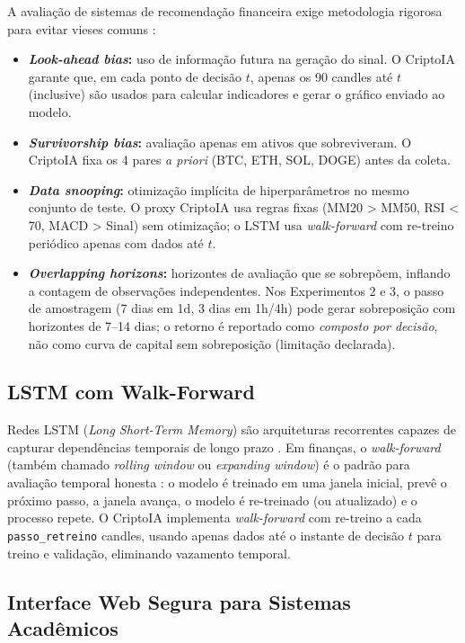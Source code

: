 \documentclass[conference]{IEEEtran}
\begin{document}
A avaliação de sistemas de recomendação financeira exige metodologia rigorosa para evitar vieses comuns \cite{bailey2014pseudomathematics}:

\begin{itemize}
  \item \textbf{\textit{Look-ahead bias}:} uso de informação futura na geração do sinal. O CriptoIA garante que, em cada ponto de decisão $t$, apenas os 90 candles até $t$ (inclusive) são usados para calcular indicadores e gerar o gráfico enviado ao modelo.
  \item \textbf{\textit{Survivorship bias}:} avaliação apenas em ativos que sobreviveram. O CriptoIA fixa os 4 pares \textit{a priori} (BTC, ETH, SOL, DOGE) antes da coleta.
  \item \textbf{\textit{Data snooping}:} otimização implícita de hiperparâmetros no mesmo conjunto de teste. O proxy CriptoIA usa regras fixas (MM20 > MM50, RSI < 70, MACD > Sinal) sem otimização; o LSTM usa \textit{walk-forward} com re-treino periódico apenas com dados até $t$.
  \item \textbf{\textit{Overlapping horizons}:} horizontes de avaliação que se sobrepõem, inflando a contagem de observações independentes. Nos Experimentos 2 e 3, o passo de amostragem (7 dias em 1d, 3 dias em 1h/4h) pode gerar sobreposição com horizontes de 7–14 dias; o retorno é reportado como \textit{composto por decisão}, não como curva de capital sem sobreposição (limitação declarada).
\end{itemize}

\subsection{LSTM com Walk-Forward}

Redes LSTM (\textit{Long Short-Term Memory}) são arquiteturas recorrentes capazes de capturar dependências temporais de longo prazo \cite{hochreiter1997lstm}. Em finanças, o \textit{walk-forward} (também chamado \textit{rolling window} ou \textit{expanding window}) é o padrão para avaliação temporal honesta \cite{fischer2018deep}: o modelo é treinado em uma janela inicial, prevê o próximo passo, a janela avança, o modelo é re-treinado (ou atualizado) e o processo repete. O CriptoIA implementa \textit{walk-forward} com re-treino a cada \texttt{passo\_retreino} candles, usando apenas dados até o instante de decisão $t$ para treino e validação, eliminando vazamento temporal.

\subsection{Interface Web Segura para Sistemas Acadêmicos}
\end{document}
